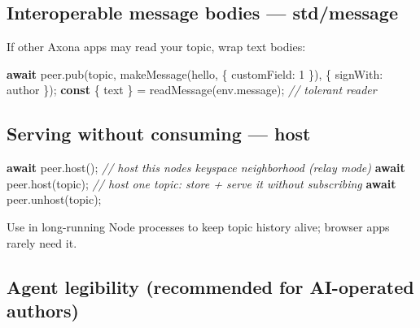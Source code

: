 \documentclass[
  nobib]{tufte-handout}
\newenvironment{Shaded}{}{}
\newcommand{\AttributeTok}[1]{\textcolor[rgb]{0.49,0.56,0.16}{#1}}
\newcommand{\CommentTok}[1]{\textcolor[rgb]{0.38,0.63,0.69}{\textit{#1}}}
\newcommand{\ControlFlowTok}[1]{\textcolor[rgb]{0.00,0.44,0.13}{\textbf{#1}}}
\newcommand{\DataTypeTok}[1]{\textcolor[rgb]{0.56,0.13,0.00}{#1}}
\newcommand{\DecValTok}[1]{\textcolor[rgb]{0.25,0.63,0.44}{#1}}
\newcommand{\FunctionTok}[1]{\textcolor[rgb]{0.02,0.16,0.49}{#1}}
\newcommand{\KeywordTok}[1]{\textcolor[rgb]{0.00,0.44,0.13}{\textbf{#1}}}
\newcommand{\NormalTok}[1]{#1}
\newcommand{\OperatorTok}[1]{\textcolor[rgb]{0.40,0.40,0.40}{#1}}
\newcommand{\StringTok}[1]{\textcolor[rgb]{0.25,0.44,0.63}{#1}}
\begin{document}
\subsection{Interoperable message bodies ---
std/message}\label{interoperable-message-bodies-stdmessage}

If other Axona apps may read your topic, wrap text bodies:

\begin{Shaded}
\begin{Highlighting}[]
\ControlFlowTok{await}\NormalTok{ peer}\OperatorTok{.}\FunctionTok{pub}\NormalTok{(topic}\OperatorTok{,} \FunctionTok{makeMessage}\NormalTok{(}\StringTok{\textquotesingle{}hello\textquotesingle{}}\OperatorTok{,}\NormalTok{ \{ }\DataTypeTok{customField}\OperatorTok{:} \DecValTok{1}\NormalTok{ \})}\OperatorTok{,}\NormalTok{ \{ }\DataTypeTok{signWith}\OperatorTok{:}\NormalTok{ author \})}\OperatorTok{;}
\KeywordTok{const}\NormalTok{ \{ text \} }\OperatorTok{=} \FunctionTok{readMessage}\NormalTok{(env}\OperatorTok{.}\AttributeTok{message}\NormalTok{)}\OperatorTok{;}   \CommentTok{// tolerant reader}
\end{Highlighting}
\end{Shaded}

\subsection{Serving without consuming ---
host}\label{serving-without-consuming-host}

\begin{Shaded}
\begin{Highlighting}[]
\ControlFlowTok{await}\NormalTok{ peer}\OperatorTok{.}\FunctionTok{host}\NormalTok{()}\OperatorTok{;}        \CommentTok{// host this node\textquotesingle{}s keyspace neighborhood (relay mode)}
\ControlFlowTok{await}\NormalTok{ peer}\OperatorTok{.}\FunctionTok{host}\NormalTok{(topic)}\OperatorTok{;}   \CommentTok{// host one topic: store + serve it without subscribing}
\ControlFlowTok{await}\NormalTok{ peer}\OperatorTok{.}\FunctionTok{unhost}\NormalTok{(topic)}\OperatorTok{;}
\end{Highlighting}
\end{Shaded}

Use in long-running Node processes to keep topic history alive; browser
apps rarely need it.

\subsection{Agent legibility (recommended for AI-operated
authors)}\label{agent-legibility-recommended-for-ai-operated-authors}
\end{document}
